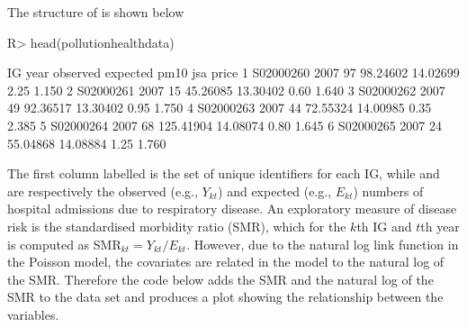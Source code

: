 \documentclass[article, nojss]{jss}
\begin{document}
The structure of  is shown below

\begin{Schunk}
\begin{Sinput}
R> head(pollutionhealthdata)
\end{Sinput}
\begin{Soutput}
         IG year observed  expected     pm10  jsa price
1 S02000260 2007       97  98.24602 14.02699 2.25 1.150
2 S02000261 2007       15  45.26085 13.30402 0.60 1.640
3 S02000262 2007       49  92.36517 13.30402 0.95 1.750
4 S02000263 2007       44  72.55324 14.00985 0.35 2.385
5 S02000264 2007       68 125.41904 14.08074 0.80 1.645
6 S02000265 2007       24  55.04868 14.08884 1.25 1.760
\end{Soutput}
\end{Schunk}

The first column labelled  is the set of unique identifiers for each IG, while  and  are respectively the observed (e.g., $Y_{kt}$) and expected (e.g., $E_{kt}$) numbers of hospital admissions due to respiratory disease. An exploratory measure of disease risk is the standardised morbidity ratio (SMR), which for the $k$th IG and $t$th year is computed as SMR$_{kt}=Y_{kt}/E_{kt}$. However, due to the natural log link function in the Poisson model, the covariates are related in the model to the natural log of the SMR. Therefore the code below adds the SMR and the natural log of the SMR to the data set and produces a  plot showing the relationship between the variables.



\end{document}

